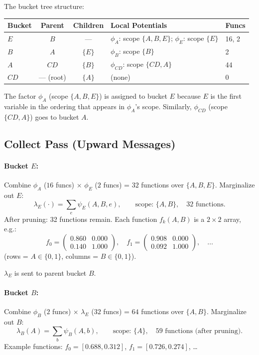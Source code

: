 \documentclass[11pt]{article}
\begin{document}
\noindent The bucket tree structure:
\begin{center}
\begin{tabular}{lccll}
\toprule
\textbf{Bucket} & \textbf{Parent} & \textbf{Children} & \textbf{Local Potentials} & \textbf{Funcs} \\
\midrule
$E$ & $B$ & --- & $\phi_A$: scope $\{A,B,E\}$; $\phi_E$: scope $\{E\}$ & 16, 2 \\
$B$ & $A$ & $\{E\}$ & $\phi_B$: scope $\{B\}$ & 2 \\
$A$ & $CD$ & $\{B\}$ & $\phi_{CD}$: scope $\{CD,A\}$ & 44 \\
$CD$ & --- (root) & $\{A\}$ & (none) & 0 \\
\bottomrule
\end{tabular}
\end{center}

The factor $\phi_A$ (scope $\{A,B,E\}$) is assigned to bucket $E$ because $E$ is the
first variable in the ordering that appears in $\phi_A$'s scope. Similarly, $\phi_{CD}$
(scope $\{CD,A\}$) goes to bucket $A$.

\subsection{Collect Pass (Upward Messages)}

\paragraph{Bucket $E$:}
Combine $\phi_A$ ($16$ funcs) $\times$ $\phi_E$ ($2$ funcs) = $32$ functions over
$\{A, B, E\}$. Marginalize out $E$:
\[
  \lambda_E(\cdot) = \sum_e \psi_E(A, B, e), \qquad \text{scope: } \{A, B\}, \quad 32 \text{ functions.}
\]
After pruning: 32 functions remain. Each function $f_k(A, B)$ is a $2 \times 2$ array,
e.g.:
\[
  f_0 = \begin{pmatrix} 0.860 & 0.000 \\ 0.140 & 1.000 \end{pmatrix}, \quad
  f_1 = \begin{pmatrix} 0.908 & 0.000 \\ 0.092 & 1.000 \end{pmatrix}, \quad \dots
\]
(rows = $A \in \{0,1\}$, columns = $B \in \{0,1\}$).

$\lambda_E$ is sent to parent bucket $B$.

\paragraph{Bucket $B$:}
Combine $\phi_B$ ($2$ funcs) $\times$ $\lambda_E$ ($32$ funcs) = $64$ functions over
$\{A, B\}$. Marginalize out $B$:
\[
  \lambda_B(A) = \sum_b \psi_B(A, b), \qquad \text{scope: } \{A\}, \quad
  59 \text{ functions (after pruning).}
\]
Example functions: $f_0 = [0.688, 0.312]$, $f_1 = [0.726, 0.274]$, \dots
\end{document}
